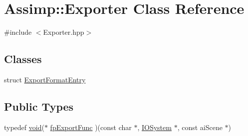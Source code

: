 \hypertarget{class_assimp_1_1_exporter}{\section{Assimp\-:\-:Exporter Class Reference}
\label{class_assimp_1_1_exporter}
}


{\ttfamily \#include $<$Exporter.\-hpp$>$}

\subsection*{Classes}
\begin{DoxyCompactItemize}
\item 
struct \hyperlink{struct_assimp_1_1_exporter_1_1_export_format_entry}{Export\-Format\-Entry}
\end{DoxyCompactItemize}
\subsection*{Public Types}
\begin{DoxyCompactItemize}
\item 
typedef \hyperlink{_s_d_l__opengl_8h_a3db05964a3cc4410f35b7ea2b7eb850d}{void}($\ast$ \hyperlink{class_assimp_1_1_exporter_aa67334a75cb24e030af984d01e622f3b}{fp\-Export\-Func} )(const char $\ast$, \hyperlink{class_assimp_1_1_i_o_system}{I\-O\-System} $\ast$, const ai\-Scene $\ast$)
\end{DoxyCompactItemize}

